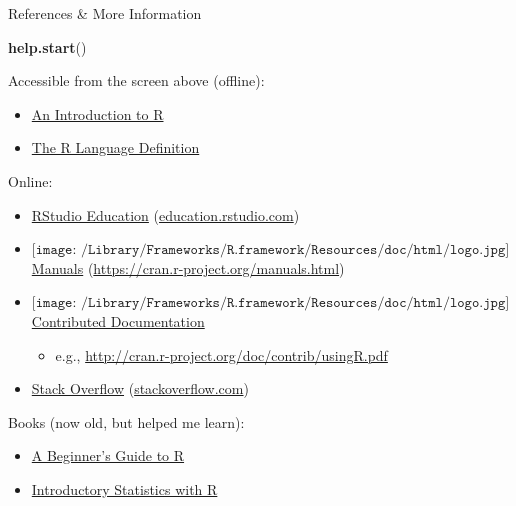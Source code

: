 \documentclass[
  11pt,
  ignorenonframetext,
]{beamer}
\newenvironment{Shaded}{\begin{snugshade}}{\end{snugshade}}
\newcommand{\FunctionTok}[1]{\textcolor[rgb]{0.13,0.29,0.53}{\textbf{#1}}}
\newcommand{\NormalTok}[1]{#1}
\providecommand{\tightlist}{%
  \setlength{\itemsep}{0pt}\setlength{\parskip}{0pt}}
\begin{document}
\begin{frame}{References \& More Information}
\protect\hypertarget{references-more-information}{}
\begin{Shaded}
\begin{Highlighting}[]
\FunctionTok{help.start}\NormalTok{()}
\end{Highlighting}
\end{Shaded}

Accessible from the screen above (offline):

\begin{itemize}
\tightlist
\item
  \href{https://cran.r-project.org/doc/manuals/r-release/R-intro.html}{An
  Introduction to R}
\item
  \href{https://cran.r-project.org/doc/manuals/r-release/R-lang.html}{The
  R Language Definition}
\end{itemize}

Online:

\begin{itemize}
\tightlist
\item
  \href{https://education.rstudio.com/}{RStudio Education}
  (\href{https://education.rstudio.com/}{education.rstudio.com})
\item
  \(\texttt{[image: /Library/Frameworks/R.framework/Resources/doc/html/logo.jpg]}\)
  \href{https://cran.r-project.org/manuals.html}{Manuals}
  (\url{https://cran.r-project.org/manuals.html})
\item
  \(\texttt{[image: /Library/Frameworks/R.framework/Resources/doc/html/logo.jpg]}\)
  \href{https://cran.r-project.org/other-docs.html}{Contributed
  Documentation}

  \begin{itemize}
  \tightlist
  \item
    e.g., \url{http://cran.r-project.org/doc/contrib/usingR.pdf}
  \end{itemize}
\item
  \href{https://stackoverflow.com/questions/tagged/r}{Stack Overflow}
  (\href{https://stackoverflow.com/}{stackoverflow.com})
\end{itemize}

Books (now old, but helped me learn):

\begin{itemize}
\tightlist
\item
  \href{https://link.springer.com/book/10.1007/978-0-387-93837-0}{A
  Beginner's Guide to R}
\item
  \href{https://link.springer.com/book/10.1007/978-0-387-79054-1}{Introductory
  Statistics with R}
\end{itemize}


\end{frame}
\end{document}

